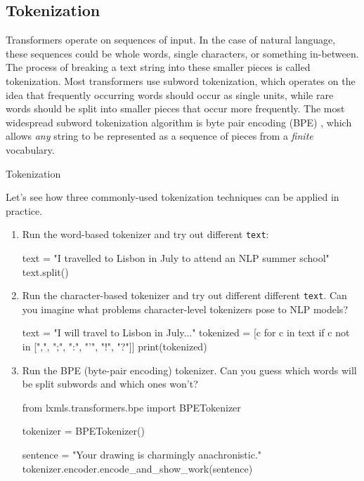 \subsection{Tokenization}
Transformers operate on sequences of input.
In the case of natural language, these sequences could be whole words, single characters, or something in-between.
The process of breaking a text string into these smaller pieces is called tokenization.
Most transformers use subword tokenization, which operates on the idea that frequently occurring words should occur as single units, while rare words should be split into smaller pieces that occur more frequently.
The most widespread subword tokenization algorithm is byte pair encoding (BPE) \citep{bpe}, which allows \emph{any} string to be represented as a sequence of pieces from a \emph{finite} vocabulary.

\begin{exercise}
Tokenization

Let's see how three commonly-used tokenization techniques can be applied in practice.
\begin{enumerate}
\item Run the word-based tokenizer and try out different {\tt text}:
\begin{python}
text = "I travelled to Lisbon in July to attend an NLP summer school"
text.split()
\end{python}
\item Run the character-based tokenizer and try out different different {\tt text}. Can you imagine what problems character-level tokenizers pose to NLP models?
\begin{python}
text = "I will travel to Lisbon in July..."
tokenized = [c for c in text if c not in [",", ";", ":", "'", "!", "?"]]
print(tokenized)
\end{python}


\item Run the BPE (byte-pair encoding) tokenizer. Can you guess which words will be split subwords and which ones won't?
\begin{python}
from lxmls.transformers.bpe import BPETokenizer

tokenizer = BPETokenizer()

sentence = "Your drawing is charmingly anachronistic."
tokenizer.encoder.encode_and_show_work(sentence)
\end{python}
\end{enumerate}
\end{exercise}



